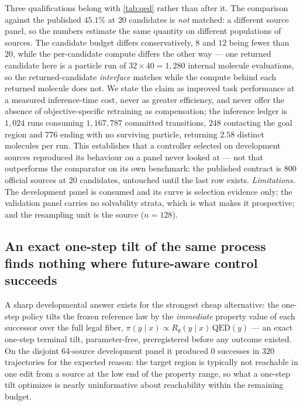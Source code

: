 Three qualifications belong with \cref{tab:qed} rather than after it.
The comparison against the published $45.1\%$ at $20$ candidates is \emph{not} matched: a different source panel, so the numbers estimate the same quantity on different populations of sources.
The candidate budget differs conservatively, $8$ and $12$ being fewer than $20$, while the per-candidate compute differs the other way --- one returned candidate here is a particle run of $32\times40=1{,}280$ internal molecule evaluations, so the returned-candidate \emph{interface} matches while the compute behind each returned molecule does not.
We state the claim as improved task performance at a measured inference-time cost, never as greater efficiency, and never offer the absence of objective-specific retraining as compensation; the inference ledger is $1{,}024$ runs consuming $1{,}167{,}787$ committed transitions, $248$ contacting the goal region and $776$ ending with no surviving particle, returning $2.58$ distinct molecules per run.
This establishes that a controller selected on development sources reproduced its behaviour on a panel never looked at --- not that \method{} outperforms the comparator on its own benchmark: the published contract is $800$ official sources at $20$ candidates, untouched until the last \method{} row exists.
\emph{Limitations.} The development panel is consumed and its curve is selection evidence only; the validation panel carries no solvability strata, which is what makes it prospective; and the resampling unit is the source ($n=128$).

\subsection{An exact one-step tilt of the same process finds nothing where future-aware control succeeds}
\label{sec:exp-attribution}

A sharp developmental answer exists for the strongest cheap alternative: the one-step policy tilts the frozen reference law by the \emph{immediate} property value of each successor over the full legal fiber, $\pi(y\mid x)\propto R_\theta(y\mid x)\,\mathrm{QED}(y)$ --- an exact one-step terminal tilt, parameter-free, preregistered before any outcome existed.
On the disjoint $64$-source development panel it produced $0$ successes in $320$ trajectories
for the expected reason: the target region is typically not reachable in one edit from a source at the low end of the property range, so what a one-step tilt optimizes is nearly uninformative about reachability within the remaining budget.

